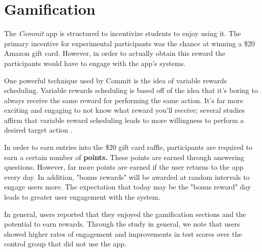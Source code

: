 \section{Gamification}
\par The \textit{Commit} app is structured to incentivize students to enjoy using it. The primary incentive for experimental participants was the chance at winning a \$20 Amazon gift card. However, in order to actually obtain this reward the participants would have to engage with the app's systems.

\par One powerful technique used by Commit is the idea of variable rewards scheduling. Variable rewards scheduling is based off of the idea that it's boring to always receive the same reward for performing the same action. It's far more exciting and engaging to not know what reward you'll receive; several studies affirm that variable reward scheduling leads to more willingness to perform a desired target action \cite{dodin2001integrated}.

\par In order to earn entries into the \$20 gift card raffle, participants are required to earn a certain number of \textbf{points.} These points are earned through answering questions. However, far more points are earned if the user returns to the app every day. In addition, "bonus rewards" will be awarded at random intervals to engage users more. The expectation that today may be the "bonus reward" day leads to greater user engagement with the system.

\par In general, users reported that they enjoyed the gamification sections and the potential to earn rewards. Through the study in general, we note that users showed higher rates of engagement and improvements in test scores over the control group that did not use the app.
